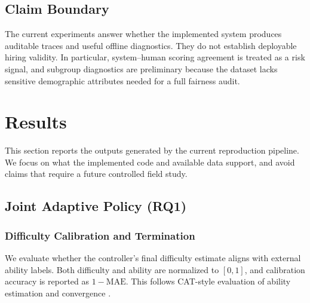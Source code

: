 ﻿\documentclass[final,3p,times,authoryear]{elsarticle}
\begin{document}
\subsection{Claim Boundary}

\noindent The current experiments answer whether the implemented system produces auditable traces and useful offline diagnostics. They do not establish deployable hiring validity. In particular, system--human scoring agreement is treated as a risk signal, and subgroup diagnostics are preliminary because the dataset lacks sensitive demographic attributes needed for a full fairness audit.

\section{Results}
\label{sec:results}

\noindent This section reports the outputs generated by the current reproduction pipeline. We focus on what the implemented code and available data support, and avoid claims that require a future controlled field study.

\subsection{Joint Adaptive Policy (RQ1)}
\label{sec:results_rq1}

\subsubsection{Difficulty Calibration and Termination}

\noindent We evaluate whether the controller's final difficulty estimate aligns with external ability labels. Both difficulty and ability are normalized to $[0,1]$, and calibration accuracy is reported as $1-\text{MAE}$. This follows CAT-style evaluation of ability estimation and convergence \cite{van2006computerized,zhuang2024catsurvey}.

\begin{table}[H]
\centering
\caption{Adaptive control: calibration accuracy across ability levels. Generated by \texttt{reproduce\_results/calc\_calibration.py}.}
\label{tab:calibration}
\end{table}
\end{document}
